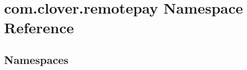 \hypertarget{namespacecom_1_1clover_1_1remotepay}{}\section{com.\+clover.\+remotepay Namespace Reference}
\label{namespacecom_1_1clover_1_1remotepay}
\subsection*{Namespaces}
\begin{DoxyCompactItemize}
\end{DoxyCompactItemize}
